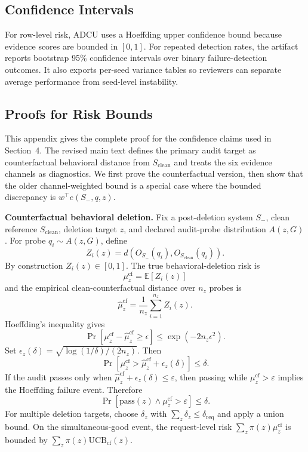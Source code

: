 \documentclass[10pt,journal,compsoc]{IEEEtran}
\newcommand{\method}{ADCU}
\begin{document}
\subsection{Confidence Intervals}

For row-level risk, \method{} uses a Hoeffding upper confidence bound because evidence scores are bounded in $[0,1]$. For repeated detection rates, the artifact reports bootstrap 95\% confidence intervals over binary failure-detection outcomes. It also exports per-seed variance tables so reviewers can separate average performance from seed-level instability.

\subsection{Proofs for Risk Bounds}

This appendix gives the complete proof for the confidence claims used in Section~4. The revised main text defines the primary audit target as counterfactual behavioral distance from $S_{\mathrm{clean}}$ and treats the six evidence channels as diagnostics. We first prove the counterfactual version, then show that the older channel-weighted bound is a special case where the bounded discrepancy is $w^\top e(S_-,q,z)$.

\textbf{Counterfactual behavioral deletion.}
Fix a post-deletion system $S_-$, clean reference $S_{\mathrm{clean}}$, deletion target $z$, and declared audit-probe distribution $A(z,G)$. For probe $q_i\sim A(z,G)$, define
\[
Z_i(z)=d(O_{S_-}(q_i),O_{S_{\mathrm{clean}}}(q_i)).
\]
By construction $Z_i(z)\in[0,1]$. The true behavioral-deletion risk is
\[
\mu^{\mathrm{cf}}_z=\mathbb{E}[Z_i(z)]
\]
and the empirical clean-counterfactual distance over $n_z$ probes is
\[
\hat\mu^{\mathrm{cf}}_z=\frac{1}{n_z}\sum_{i=1}^{n_z}Z_i(z).
\]
Hoeffding's inequality gives
\[
\Pr[\mu^{\mathrm{cf}}_z-\hat\mu^{\mathrm{cf}}_z\geq \epsilon]
\leq \exp(-2n_z\epsilon^2).
\]
Set $\epsilon_z(\delta)=\sqrt{\log(1/\delta)/(2n_z)}$. Then
\[
\Pr[\mu^{\mathrm{cf}}_z>
\hat\mu^{\mathrm{cf}}_z+\epsilon_z(\delta)]
\leq \delta.
\]
If the audit passes only when $\hat\mu^{\mathrm{cf}}_z+\epsilon_z(\delta)\leq\varepsilon$, then passing while $\mu^{\mathrm{cf}}_z>\varepsilon$ implies the Hoeffding failure event. Therefore
\[
\Pr[\mathrm{pass}(z)\wedge \mu^{\mathrm{cf}}_z>\varepsilon]\leq \delta.
\]
For multiple deletion targets, choose $\delta_z$ with $\sum_z\delta_z\leq\delta_{\mathrm{req}}$ and apply a union bound. On the simultaneous-good event, the request-level risk $\sum_z\pi(z)\mu^{\mathrm{cf}}_z$ is bounded by $\sum_z\pi(z)\mathrm{UCB}_{\mathrm{cf}}(z)$.
\end{document}

